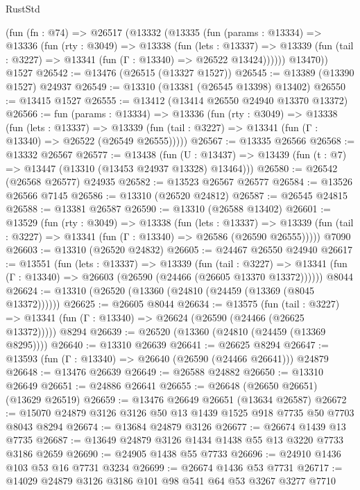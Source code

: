 \begin{lexlean}{RustStd}
\begin{coremodule}
    (fun (fn : @74) =>
    @26517
      (@13332
        (@13335
          (fun (params : @13334) =>
          @13336
            (fun (rty : @3049) =>
            @13338
              (fun (lets : @13337) =>
              @13339 (fun (tail : @3227) => @13341 (fun (Γ : @13340) => @26522 @13424))))))
        @13470))
    @1527
@26542 := @13476 (@26515 (@13327 @1527))
@26545 := @13389 (@13390 @1527) @24937
@26549 := @13310 (@13381 (@26545 @13398) @13402)
@26550 := @13415 @1527
@26555 := @13412 (@13414 @26550 @24940 @13370 @13372)
@26566 := fun (params : @13334) =>
  @13336
    (fun (rty : @3049) =>
    @13338
      (fun (lets : @13337) =>
      @13339 (fun (tail : @3227) => @13341 (fun (Γ : @13340) => @26522 (@26549 @26555)))))
@26567 := @13335 @26566
@26568 := @13332 @26567
@26577 := @13438
    (fun (U : @13437) => @13439 (fun (t : @7) => @13447 (@13310 (@13453 @24937 @13328) @13464)))
@26580 := @26542 (@26568 @26577) @24935
@26582 := @13523 @26567 @26577
@26584 := @13526 @26566 @7145
@26586 := @13310 (@26520 @24812)
@26587 := @26545 @24815
@26588 := @13381 @26587
@26590 := @13310 (@26588 @13402)
@26601 := @13529
    (fun (rty : @3049) =>
    @13338
      (fun (lets : @13337) =>
      @13339 (fun (tail : @3227) => @13341 (fun (Γ : @13340) => @26586 (@26590 @26555)))))
    @7090
@26603 := @13310 (@26520 @24832)
@26605 := @24467 @26550 @24940
@26617 := @13551
    (fun (lets : @13337) =>
    @13339
      (fun (tail : @3227) =>
      @13341 (fun (Γ : @13340) => @26603 (@26590 (@24466 (@26605 @13370 @13372))))))
    @8044
@26624 := @13310 (@26520 (@13360 (@24810 (@24459 (@13369 (@8045 @13372))))))
@26625 := @26605 @8044
@26634 := @13575
    (fun (tail : @3227) => @13341 (fun (Γ : @13340) => @26624 (@26590 (@24466 (@26625 @13372)))))
    @8294
@26639 := @26520 (@13360 (@24810 (@24459 (@13369 @8295))))
@26640 := @13310 @26639
@26641 := @26625 @8294
@26647 := @13593 (fun (Γ : @13340) => @26640 (@26590 (@24466 @26641))) @24879
@26648 := @13476 @26639
@26649 := @26588 @24882
@26650 := @13310 @26649
@26651 := @24886 @26641
@26655 := @26648 (@26650 @26651) (@13629 @26519)
@26659 := @13476 @26649 @26651 (@13634 @26587)
@26672 := @15070 @24879 @3126 @3126 @50 @13 @1439 @1525 @918 @7735 @50 @7703 @8043 @8294
@26674 := @13684 @24879 @3126
@26677 := @26674 @1439 @13 @7735
@26687 := @13649 @24879 @3126 @1434 @1438 @55 @13 @3220 @7733 @3186 @2659
@26690 := @24905 @1438 @55 @7733
@26696 := @24910 @1436 @103 @53 @16 @7731 @3234
@26699 := @26674 @1436 @53 @7731
@26717 := @14029
    @24879
    @3126
    @3186
    @101
    @98
    @541
    @64
    @53
    @3267
    @3277
    @7710

\end{coremodule}
\end{lexlean}
